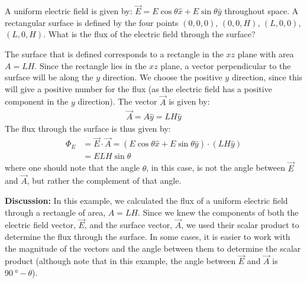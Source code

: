 \begin{example}{A uniform electric field is given by: $\vec E=E\cos\theta\hat x+E\sin\theta\hat y $ throughout space. A rectangular surface is defined by the four points $(0,0,0)$, $(0,0,H)$, $(L,0,0)$, $(L,0,H)$. What is the flux of the electric field through the surface?}

The surface that is defined corresponds to a rectangle in the $xz$ plane with area $A=LH$. Since the rectangle lies in the $xz$ plane, a vector perpendicular to the surface will be along the $y$ direction. We choose the positive $y$ direction, since this will give a positive number for the flux (as the electric field has a positive component in the $y$ direction). The vector $\vec A$ is given by:
\begin{align*}
\vec A =A\hat y=LH\hat y
\end{align*}
The flux through the surface is thus given by:
\begin{align*}
\Phi_E&=\vec E\cdot \vec A=(E\cos\theta\hat x+E\sin\theta\hat y)\cdot(LH\hat y)\\
&=ELH\sin\theta
\end{align*}
where one should note that the angle $\theta$, in this case, is not the angle between $\vec E$ and $\vec A$, but rather the complement of that angle. 

\textbf{Discussion:} In this example, we calculated the flux of a uniform electric field through a rectangle of area, $A=LH$. Since we knew the components of both the electric field vector, $\vec E$, and the surface vector, $\vec A$, we used their scalar product to determine the flux through the surface. In some cases, it is easier to work with the magnitude of the vectors and the angle between them to determine the scalar product (although note that in this example, the angle between $\vec E$ and $\vec A$ is $\SI{90}{\degree}-\theta$).
\end{example}

